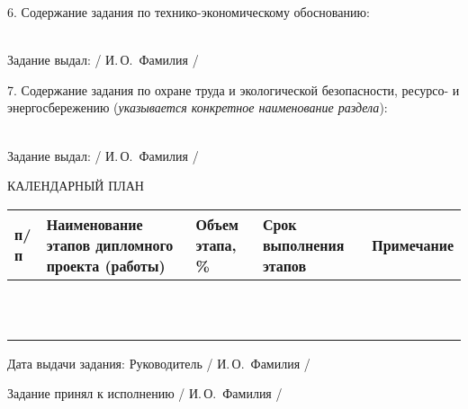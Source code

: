 {  \vspace{1em}

  6. Содержание задания по технико-экономическому обоснованию:
  \lineunderscore\\
  \lineunderscore\\
  \lineunderscore

  Задание выдал: \hfill{} \uline{\hspace*{6em}} / И.\,О.~Фамилия /   

  \vspace{1em}

  7. Содержание задания по охране труда и экологической безопасности, ресурсо- и энергосбережению (\textit{указывается конкретное наименование раздела}): 
  \lineunderscore\\
  \lineunderscore\\
  \lineunderscore

  Задание выдал:  \hfill{} \uline{\hspace*{6em}} / И.\,О.~Фамилия /  

  \vfill

  \begin{center}
    КАЛЕНДАРНЫЙ ПЛАН
  \end{center}

  \begin{tabular}{| >{\centering}m{} 
                  | >{\centering}m{} 
                  | >{\centering}m{}
                  | >{\centering}m{}  
                  | >{\centering\arraybackslash}m{}|}
    \hline \No{} \No{} п/п & Наименование этапов дипломного проекта (работы) & Объем этапа, \% & Срок выполнения этапов & Примечание \\
    \hline & & & & \\
    \hline & & & & \\
    \hline & & & & \\
    \hline & & & & \\
    \hline & & & & \\
    \hline & & & & \\
    \hline & & & & \\
    \hline & & & & \\
    \hline & & & & \\
    \hline & & & & \\
    \hline & & & & \\
    \hline
  \end{tabular}

  \vspace{2em}

  Дата выдачи задания: \uline{\hspace*{6em}} \hspace{2ex} Руководитель \hfill{} \uline{\hspace*{4em}} / И.\,О.~Фамилия /

  \vspace{1em}

  Задание принял к исполнению \hfill{} \uline{\hspace*{4em}} / И.\,О.~Фамилия /

  \restoregeometry
}